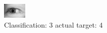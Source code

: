 \begin{figure}[h!]
\begin{center}
\includegraphics[width=0.60\columnwidth]{figures/ID3105_class_3_target_4.png}
\end{center}
\caption{ Classification: 3 actual target: 4}
\label{fig:ID3105_class_3_target_4}
\end{figure}
